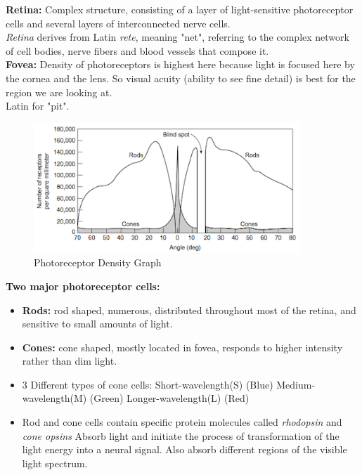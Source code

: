 \documentclass{article}
\begin{document}
\textbf{Retina:} Complex structure, consisting of a layer of light-sensitive photoreceptor cells and several layers of interconnected nerve cells. \\
\textit{Retina} derives from Latin \textit{rete}, meaning "net", referring to the complex network of cell bodies, nerve fibers and blood vessels that compose it. \\

\textbf{Fovea:} Density of photoreceptors is highest here because light is focused here by the cornea and the lens. So visual acuity (ability to see fine detail) is best for the region we are looking at. \\
Latin for "pit". \\

\begin{figure}[htp]
\centering
\includegraphics[width=10cm]{images/RodConeDensity.png}
\caption{Photoreceptor Density Graph}
\label{fig: Density graph}
\end{figure}

\textbf{Two major photoreceptor cells:}
\begin{itemize}
    \item \textbf{Rods:} rod shaped, numerous, distributed throughout most of the retina, and sensitive to small amounts of light. 
    \item \textbf{Cones:} cone shaped, mostly located in fovea, responds to higher intensity rather than dim light. 
    \item 3 Different types of cone cells:
        \subitem Short-wavelength(S) (Blue)
        \subitem Medium-wavelength(M) (Green)
        \subitem Longer-wavelength(L) (Red)
    \item Rod and cone cells contain specific protein molecules called \textit{rhodopsin} and \textit{cone opsins} 
        \subitem Absorb light and initiate the process of transformation of the light energy into a neural signal. Also absorb different regions of the visible light spectrum. 
\end{itemize}
\end{document}
